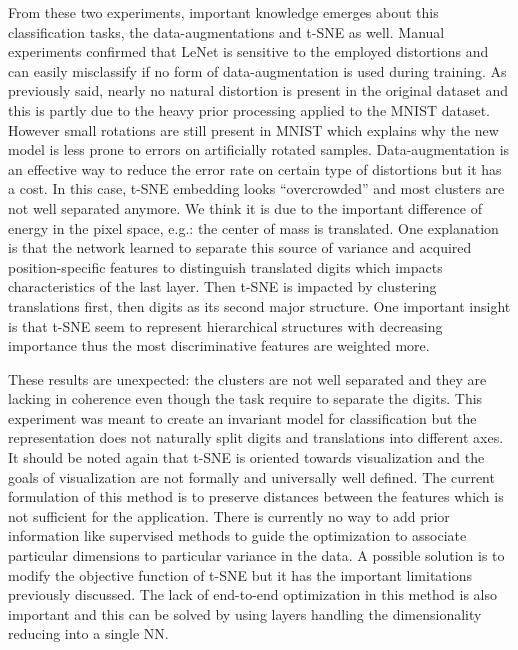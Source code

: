 \documentclass[a4paper,12pt]{report}
\newcommand{\eg}{e.g.}
\begin{document}
From these two experiments, important knowledge emerges about this classification tasks, the data-augmentations and t-SNE as well.
Manual experiments confirmed that LeNet is sensitive to the employed distortions and can easily misclassify if no form of data-augmentation is used during training.
As previously said, nearly no natural distortion is present in the original dataset and this is partly due to the heavy prior processing applied to the MNIST dataset.
However small rotations are still present in MNIST which explains why the new model is less prone to errors on artificially rotated samples.
Data-augmentation is an effective way to reduce the error rate on certain type of distortions but it has a cost.
In this case, t-SNE embedding looks ``overcrowded'' and most clusters are not well separated anymore.
We think it is due to the important difference of energy in the pixel space, \eg: the center of mass is translated.
One explanation is that the network learned to separate this source of variance and acquired position-specific features to distinguish translated digits which impacts characteristics of the last layer.
Then t-SNE is impacted by clustering translations first, then digits as its second major structure.
One important insight is that t-SNE seem to represent hierarchical structures with decreasing importance thus the most discriminative features are weighted more.

These results are unexpected: the clusters are not well separated and they are lacking in coherence even though the task require to separate the digits.
This experiment was meant to create an invariant model for classification but the representation does not naturally split digits and translations into different axes.
It should be noted again that t-SNE is oriented towards visualization and the goals of visualization are not formally and universally well defined.
The current formulation of this method is to preserve distances between the features which is not sufficient for the application.
There is currently no way to add prior information like supervised methods to guide the optimization to associate particular dimensions to particular variance in the data.
A possible solution is to modify the objective function of t-SNE but it has the important limitations previously discussed.
The lack of end-to-end optimization in this method is also important and this can be solved by using layers handling the dimensionality reducing into a single NN.
\end{document}
